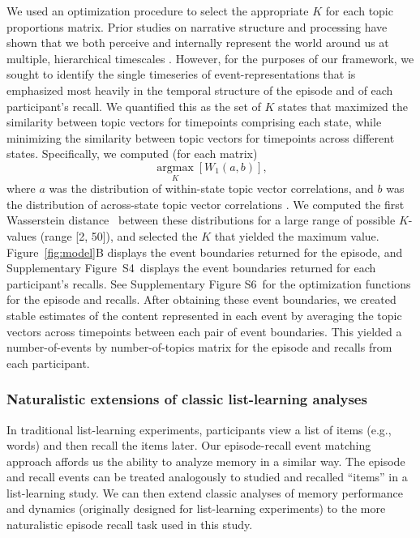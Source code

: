 \documentclass[10pt]{article}
\newcommand{\argmax}{\mathop{\mathrm{argmax}}\limits}
\newcommand{\corrmats}{S4}
\newcommand{\kopt}{S6}
\begin{document}
We used an optimization procedure to select the appropriate $K$ for each topic proportions matrix.  Prior studies on narrative structure and processing have shown that we both perceive and internally represent the world around us at multiple, hierarchical timescales \citep[e.g.,][]{HassEtal08, LernEtal11, HassEtal15, ChenEtal17, BaldEtal17, BaldEtal18}.  However, for the purposes of our framework, we sought to identify the single timeseries of event-representations that is emphasized most heavily in the temporal structure of the episode and of each participant's recall.  We quantified this as the set of $K$ states that maximized the similarity between topic vectors for timepoints comprising each state, while minimizing the similarity between topic vectors for timepoints across different states.  Specifically, we computed (for each matrix)
\[
  \argmax_K \left[W_{1}(a, b)\right],
\]
where $a$ was the distribution of within-state topic vector correlations, and $b$ was the distribution of across-state topic vector correlations .  We computed the first Wasserstein distance~\citep[$W_{1}$; also known as ``Earth mover's distance'';][]{Dobr70, RamdEtal17} between these distributions for a large range of possible $K$-values (range [2, 50]), and selected the $K$ that yielded the maximum value.  Figure~\ref{fig:model}B displays the event boundaries returned for the episode, and Supplementary Figure~\corrmats~displays the event boundaries returned for each participant's recalls.  See Supplementary Figure \kopt~for the optimization functions for the episode and recalls.  After obtaining these event boundaries, we created stable estimates of the content represented in each event by averaging the topic vectors across timepoints between each pair of event boundaries.  This yielded a number-of-events by number-of-topics matrix for the episode and recalls from each participant.

\subsubsection*{Naturalistic extensions of classic list-learning analyses}
In traditional list-learning experiments, participants view a list of items (e.g., words) and then recall the items later.  Our episode-recall event matching approach affords us the ability to analyze memory in a similar way. The episode and recall events can be treated analogously to studied and recalled ``items'' in a list-learning study.  We can then extend classic analyses of memory performance and dynamics (originally designed for list-learning experiments) to the more naturalistic episode recall task used in this study.
\end{document}
